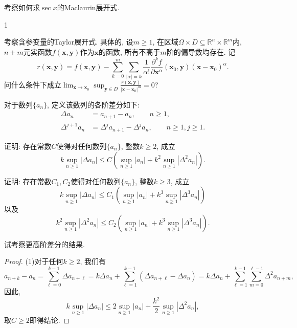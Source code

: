 \begin{quizb}
\woe 考察如何求\(\sec x\)的Maclaurin展开式.
\begin{solution}
	1
\end{solution}
\woe 考察含参变量的Taylor展开式. 具体的, 设\(m\geqslant 1\), 在区域\(\varOmega\times D\subseteq\mathbb{R}^n\times\mathbb{R}^m\)内, \(n+m\)元实函数\(f(\boldsymbol{x},\boldsymbol{y})\)作为\(\boldsymbol{x}\)的函数, 所有不高于\(m\)阶的偏导数均存在. 记\[r(\boldsymbol{x},\boldsymbol{y})=f(\boldsymbol{x},\boldsymbol{y})-\sum_{k=0}^{m}\sum_{\left|\alpha\right|=k}\frac{1}{\alpha!}\frac{\partial^kf}{\partial\boldsymbol{x}^\alpha}(\boldsymbol{x}_0,\boldsymbol{y})(\boldsymbol{x}-\boldsymbol{x}_0)^\alpha.\]问什么条件下成立\(\lim_{\boldsymbol{x}\rightarrow\boldsymbol{x}_0}\sup_{\boldsymbol{y}\in D}\frac{r(\boldsymbol{x},\boldsymbol{y})}{|\boldsymbol{x}-\boldsymbol{x}_0|^m}=0\)?
\begin{solution}
	
\end{solution}
\woe 对于数列\(\{a_n\}\), 定义该数列的各阶差分如下:\[\begin{split}
\Delta a_n&=a_{n+1}-a_n,\qquad n\geqslant 1,\\
\Delta^{j+1}a_n&=\Delta^{j}a_{n+1}-\Delta^{j}a_n,\qquad n\geqslant1,j\geqslant 1.
\end{split}\]
\begin{quizs}
\item 证明: 存在常数\(C\)使得对任何数列\(\{a_n\}\), 整数\(k\geqslant 2\), 成立\[k\sup_{n\geqslant 1}|\Delta a_n|\leqslant C\left(\sup_{n\geqslant 1}|a_n|+k^2\sup_{n\geqslant 1}|\Delta^2 a_n|\right).\]
\item 证明: 存在常数\(C_1,C_2\)使得对任何数列\(\{a_n\}\), 整数\(k\geqslant 3\), 成立\[k\sup_{n\geqslant 1}|\Delta a_n|\leqslant C_1\left(\sup_{n\geqslant 1}|a_n|+k^3\sup_{n\geqslant 1}|\Delta^3 a_n|\right)\]以及\[k^2\sup_{n\geqslant 1}|\Delta^2 a_n|\leqslant C_2\left(\sup_{n\geqslant 1}|a_n|+k^3\sup_{n\geqslant 1}|\Delta^3 a_n|\right).\]
\item 试考察更高阶差分的结果.
\end{quizs}
\begin{proof}
	(1)对于任何\(k\geqslant 2\), 我们有\[a_{n+k}-a_n=\sum_{\ell=0}^{k-1}\Delta a_{n+\ell}=k\Delta a_n+\sum_{\ell=1}^{k-1}\left(\Delta a_{n+\ell}-\Delta a_n\right)=k\Delta a_n+\sum_{\ell=1}^{k-1}\sum_{m=0}^{\ell-1}\Delta^2a_{n+m},\]因此,\[k\sup_{n\geqslant 1}|\Delta a_n|\leqslant 2\sup_{n\geqslant 1}|a_n|+\frac{k^2}{2}\sup_{n\geqslant 1}|\Delta^2a_n|,\]取\(C\geqslant 2\)即得结论.
	

\end{proof}
\end{quizb}
